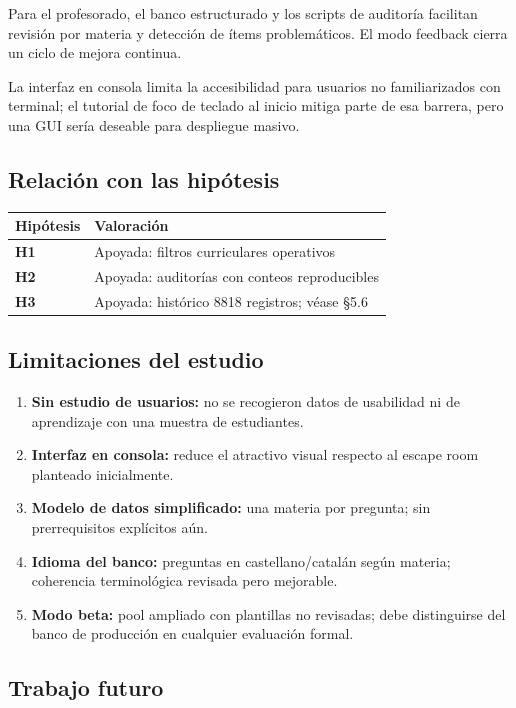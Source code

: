 \documentclass[11pt,a4paper]{article}
\begin{document}
Para el profesorado, el banco estructurado y los scripts de auditoría facilitan revisión por materia y detección de ítems problemáticos. El modo feedback cierra un ciclo de mejora continua.

La interfaz en consola limita la accesibilidad para usuarios no familiarizados con terminal; el tutorial de foco de teclado al inicio mitiga parte de esa barrera, pero una GUI sería deseable para despliegue masivo.

\subsection{Relación con las hipótesis}

\begin{tabular}{@{}lp{9cm}@{}}
\toprule
\textbf{Hipótesis} & \textbf{Valoración} \\
\midrule
\textbf{H1} & Apoyada: filtros curriculares operativos \\
\textbf{H2} & Apoyada: auditorías con conteos reproducibles \\
\textbf{H3} & Apoyada: histórico 8818 registros; véase \S5.6 \\
\bottomrule
\end{tabular}

\subsection{Limitaciones del estudio}

\begin{enumerate}
  \item \textbf{Sin estudio de usuarios:} no se recogieron datos de usabilidad ni de aprendizaje con una muestra de estudiantes.
  \item \textbf{Interfaz en consola:} reduce el atractivo visual respecto al escape room planteado inicialmente.
  \item \textbf{Modelo de datos simplificado:} una materia por pregunta; sin prerrequisitos explícitos aún.
  \item \textbf{Idioma del banco:} preguntas en castellano/catalán según materia; coherencia terminológica revisada pero mejorable.
  \item \textbf{Modo beta:} pool ampliado con plantillas no revisadas; debe distinguirse del banco de producción en cualquier evaluación formal.
\end{enumerate}

\subsection{Trabajo futuro}
\end{document}

